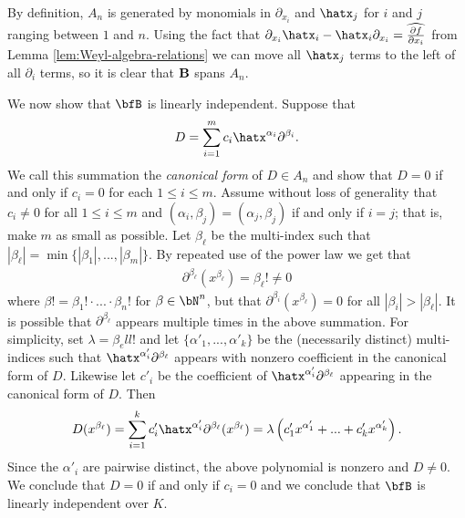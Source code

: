 \begin{prf}
	By definition, $A_n$ is generated by monomials in $\partial_{x_i}$ and $\hatx_j$ for $i$ and $j$ ranging between $1$ and $n$. Using the fact that $\partial_{x_i}\hatx_i - \hatx_i\partial_{x_i} = \widehat{\frac{\partial f}{\partial x_i}}$ from Lemma \ref{lem:Weyl-algebra-relations} we can move all $\hatx_j$ terms to the left of all $\partial_i$ terms, so it is clear that $\bf{B}$ spans $A_n$. 

	We now show that $\bfB$ is linearly independent. Suppose that 
	\begin{align*}
		D = \sum_{i=1}^m c_{i}\hatx^{\alpha_i}\partial^{\beta_i}.
	\end{align*}
	We call this summation the \emph{canonical form} of $D \in A_n$ and show that $D = 0$ if and only if $c_i = 0$ for each $1\leq i\leq m$. Assume without loss of generality that $c_i \neq 0$ for all $1\leq i\leq m$ and $(\alpha_i,\beta_j) = (\alpha_j,\beta_j)$ if and only if $i = j$; that is, make $m$ as small as possible. Let $\beta_\ell$ be the multi-index such that $|\beta_\ell| = \min\{|\beta_1|,...,|\beta_m|\}$. By repeated use of the power law we get that
	\begin{align*}
		\partial^{\beta_\ell}(x^{\beta_\ell}) = \beta_\ell! \neq 0
	\end{align*}
	where $\beta! = \beta_1!\cdot...\cdot \beta_n!$ for $\beta \in \bN^n$, but that $\partial^{\beta_i}(x^{\beta_\ell}) = 0$ for all $|\beta_i| > |\beta_\ell|$. It is possible that $\partial^{\beta_\ell}$ appears multiple times in the above summation. For simplicity, set $\lambda = \beta_ell!$ and let $\{\alpha'_1,...,\alpha'_k\}$ be the (necessarily distinct) multi-indices such that $\hatx^{\alpha'_i}\partial^{\beta_\ell}$ appears with nonzero coefficient in the canonical form of $D$. Likewise let $c'_i$ be the coefficient of $\hatx^{\alpha'_i}\partial^{\beta_\ell}$ appearing in the canonical form of $D$. Then
	\begin{align*}
		D(x^{\beta_\ell}) = \sum_{i=1}^k c'_{i}\hatx^{\alpha'_i}\partial^{\beta_\ell}(x^{\beta_\ell}) = \lambda \left(c'_1x^{\alpha'_1} + ... + c'_kx^{\alpha'_k}\right).
	\end{align*}
	Since the $\alpha'_i$ are pairwise distinct, the above polynomial is nonzero and $D \neq 0$. We conclude that $D = 0$ if and only if $c_i = 0$ and we conclude that $\bfB$ is linearly independent over $K$.
\end{prf}

